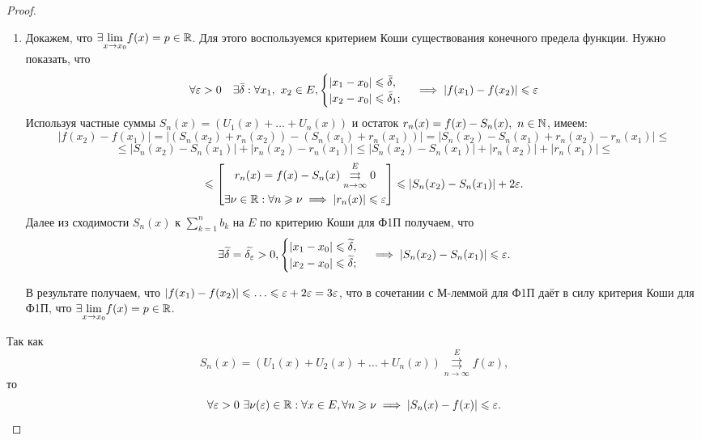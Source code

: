 \documentclass[../../main.tex]{subfiles}
\begin{document}
\begin{proof}
	\;
	
	\begin{enumerate}
		\item Докажем, что $\exists \underset{x \to x_0}{\lim} f(x) = 
	p \in \mathbb{R}$. Для этого воспользуемся критерием Коши существования 
	конечного предела функции. Нужно показать, что
	\begin{equation}
	\label{lec2:17}
	\forall \varepsilon > 0 \quad \exists \bar\delta :
	\forall x_1,\ x_2 \in E, 
	\begin{cases}
	|x_1 - x_0| \leqslant \bar\delta, \\
	|x_2 - x_0| \leqslant \bar\delta_1;
	\end{cases} \implies
	|f(x_1) - f(x_2)| \leqslant \varepsilon
	\end{equation}
	Используя частные суммы $S_n(x) = (U_1(x) + \ldots + U_n(x))$ и 
	остаток $r_n(x) = f(x) - S_n(x),\ n \in \mathbb{N}$, имеем:
	\[
	|f(x_2) - f(x_1)| = |(S_n(x_2) + r_n(x_2)) - (S_n(x_1) + r_n(x_1))| =
	|S_n(x_2) - S_n(x_1) + r_n(x_2) - r_n(x_1)| \leq 
	\]
	\[
	\leq |S_n(x_2) - S_n(x_1)| + |r_n(x_2) - r_n(x_1)| \leq 
	|S_n(x_2) - S_n(x_1)| + |r_n(x_2)| + |r_n(x_1)| \leq
	\]
	\[
	\leqslant 
	\left[
	\begin{gathered}
	r_n(x) = f(x) - S_n(x) \overset{E}
	{\underset{n \to \infty}\rightrightarrows} 0 \\
	\exists \nu \in \mathbb{R} : \forall n \geqslant \nu \implies
	|r_n(x)| \leqslant \varepsilon
	\end{gathered}
	\right] \leqslant |S_n(x_2) - S_n(x_1)| + 2\varepsilon.
	\]
	Далее из сходимости $S_n(x)$ к $\sum\limits_{k=1}^n b_k$
	на $E$ по критерию Коши для Ф1П
	получаем, что \[\exists \widetilde{\delta} = \widetilde{\delta_\varepsilon} > 0,
	\begin{cases} 
	|x_1 - x_0| \leqslant \widetilde{\delta}, \\
	|x_2 - x_0| \leqslant \widetilde{\delta};
	\end{cases} \implies
	|S_n(x_2) - S_n(x_1)| \leqslant \varepsilon.\]
	
	В результате получаем, что $|f(x_1) - f(x_2)| \leqslant \ldots \leqslant 
	\varepsilon + 2\varepsilon = 3\varepsilon$, что в сочетании с М-леммой для Ф1П даёт
	в силу критерия Коши для Ф1П, что $\exists \underset{x \to x_0}{\lim}
	f(x) = p \in \mathbb{R}$.
	\end{enumerate}
	
	Так как 
\[
S_n(x) = (U_1(x) + U_2(x) + \ldots + U_n(x)) \overset{E}{\underset{n \to 
\infty}\rightrightarrows} f(x),
\]
 то
\begin{equation} \label{eq:18}
	\forall \varepsilon > 0 \ \exists \nu(\varepsilon) \in \mathbb{R} : \forall x \in E, \forall n \geqslant 
	\nu \implies |S_n(x) - f(x)| \leqslant \varepsilon.
\end{equation}


\end{proof}
\end{document}
